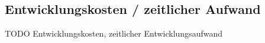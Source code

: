 \subsection{Entwicklungskosten / zeitlicher Aufwand}
TODO Entwicklungskosten, zeitlicher Entwicklungsaufwand